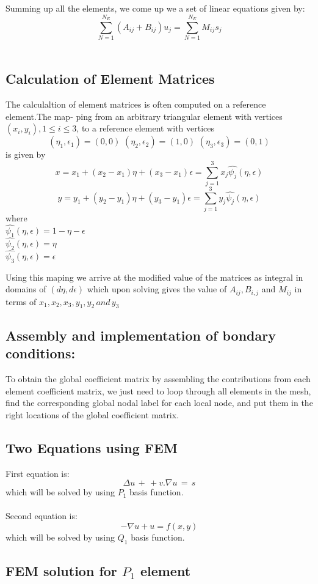 \documentclass[9pt]{article}
\begin{document}
Summing up all the elements, we come up we a set of linear equations given by:
\[
\sum_{N=1}^{N_E}(A_{ij}+B_{ij})u_j = \sum_{N=1}^{N_E} M_{ij}s_j 
\]
\\
\subsection{Calculation of Element Matrices}
The calculaltion of element matrices is often computed on a reference element.The map-
ping from an arbitrary triangular element with vertices $(x_i,y_i), 1 \leq i \leq 3$, to
a reference element with vertices
\[
(\eta_1,\epsilon_1) = (0,0) \, \, (\eta_2,\epsilon_2) = (1,0) \, \, (\eta_3,\epsilon_3) = (0,1)
\]
is given by 
\[
x = x_1 + (x_2-x_1)\eta+(x_3-x_1)\epsilon = \sum_{j=1}^{3}x_j\hat{\psi_j}(\eta,\epsilon)
\]
\[
y = y_1 + (y_2-y_1)\eta+(y_3-y_1)\epsilon = \sum_{j=1}^{3}y_j\hat{\psi_j}(\eta,\epsilon)
\]
where \\
$\hat{\psi_1}(\eta,\epsilon) = 1-\eta-\epsilon$ \\ $\hat{\psi_2}(\eta,\epsilon) =\eta$ \\$\hat{\psi_3}(\eta,\epsilon) =\epsilon$

Using this maping we arrive at the modified value of the matrices as integral in domains of $(d \eta,d \epsilon)$  which upon solving gives the value of $A_{ij}, B_{i,j}$ and $M_{ij}$ in terms of $x_1,x_2,x_3,y_1,y_2 \,and\, y_3$ 
\\
\subsection{Assembly and implementation of bondary conditions:}
To obtain the global coefficient matrix by assembling the contributions from
each element coefficient matrix, we just need to loop through all elements in
the mesh, find the corresponding global nodal label for each local node, and
put them in the right locations of the global coefficient matrix.
\\
\subsection{Two Equations using FEM}
First equation is:
\[
\Delta{u}\,+\,+v . \nabla u\,=\,s
\] 
which will be solved by using $P_1$ basis function.
\\ \\
Second equation is:
\[
-\nabla u + u = f(x,y)
\]
which will be solved by using $Q_1$ basis function.
 
\subsection{FEM solution for $P_1$ element}
\end{document}
